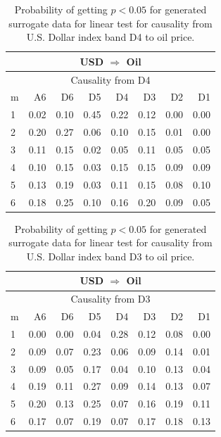 %
%
\begin{table}[H]
\begin{center}
\begin{tabular}{l|r r r r r r r}
\hline\hline
\multicolumn{8}{c}{USD $\Rightarrow$ Oil}\\
\hline
\multicolumn{8}{c}{Causality from D4}\\
\hline\hline
m & A6 & D6 & D5 & D4 & D3 & D2 & D1 \\
\hline
1 & 0.02 & 0.10 & 0.45 & 0.22 & 0.12 & 0.00 & 0.00 \\
2 & 0.20 & 0.27 & 0.06 & 0.10 & 0.15 & 0.01 & 0.00 \\
3 & 0.11 & 0.15 & 0.02 & 0.05 & 0.11 & 0.05 & 0.05 \\
4 & 0.10 & 0.15 & 0.03 & 0.15 & 0.15 & 0.09 & 0.09 \\
5 & 0.13 & 0.19 & 0.03 & 0.11 & 0.15 & 0.08 & 0.10 \\
6 & 0.18 & 0.25 & 0.10 & 0.16 & 0.20 & 0.09 & 0.05 \\
\hline\hline
\end{tabular}
\caption{Probability of getting $p < 0.05$ for generated surrogate data for linear test for causality from U.S. Dollar index band D4 to oil price.}
\end{center}
\end{table}

%
%
\begin{table}[H]
\begin{center}
\begin{tabular}{l|r r r r r r r}
\hline\hline
\multicolumn{8}{c}{USD $\Rightarrow$ Oil}\\
\hline
\multicolumn{8}{c}{Causality from D3}\\
\hline\hline
m & A6 & D6 & D5 & D4 & D3 & D2 & D1 \\
\hline
1 & 0.00 & 0.00 & 0.04 & 0.28 & 0.12 & 0.08 & 0.00 \\
2 & 0.09 & 0.07 & 0.23 & 0.06 & 0.09 & 0.14 & 0.01 \\
3 & 0.09 & 0.05 & 0.17 & 0.04 & 0.10 & 0.13 & 0.04 \\
4 & 0.19 & 0.11 & 0.27 & 0.09 & 0.14 & 0.13 & 0.07 \\
5 & 0.20 & 0.13 & 0.25 & 0.07 & 0.16 & 0.19 & 0.11 \\
6 & 0.17 & 0.07 & 0.19 & 0.07 & 0.17 & 0.18 & 0.13 \\
\hline\hline
\end{tabular}
\caption{Probability of getting $p < 0.05$ for generated surrogate data for linear test for causality from U.S. Dollar index band D3 to oil price.}
\end{center}
\end{table}

